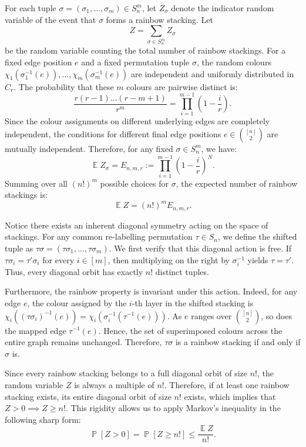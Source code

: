 \documentclass[10pt,a4paper]{amsart}
\newcommand\E{\operatorname{\mathbb{E}}}
\renewcommand\Pr{\operatorname{\mathbb{P}}}
\renewcommand\le{\leqslant}
\renewcommand\ge{\geqslant}
\begin{document}
For each tuple $\sigma = (\sigma_1, \dots, \sigma_m) \in S_n^m$, let $Z_\sigma$ denote the indicator random variable of the event that $\sigma$ forms a rainbow stacking. Let 
$$Z = \sum_{\sigma \in S_n^m} Z_\sigma$$
be the random variable counting the total number of rainbow stackings. For a fixed edge position $e$ and a fixed permutation tuple $\sigma$, the random colours $\chi_1(\sigma_1^{-1}(e)), \dots, \chi_m(\sigma_m^{-1}(e))$ are independent and uniformly distributed in $C_r$. The probability that these $m$ colours are pairwise distinct is:
\[ \frac{r(r-1)\dots(r-m+1)}{r^m} = \prod_{i=1}^{m-1} \left(1 - \frac{i}{r}\right). \]
Since the colour assignments on different underlying edges are completely independent, the conditions for different final edge positions $e \in \binom{[n]}{2}$ are mutually independent. Therefore, for any fixed $\sigma \in S_n^m$, we have:
\begin{equation} \label{eq:EZ_sigma}
\E Z_\sigma = E_{n,m,r} := \prod_{i=1}^{m-1} \left(1 - \frac{i}{r}\right)^N.
\end{equation}
Summing over all $(n!)^m$ possible choices for $\sigma$, the expected number of rainbow stackings is:
\begin{equation} \label{eq:EZ_total}
\E Z = (n!)^m E_{n,m,r}.
\end{equation}

Notice there exists an inherent diagonal symmetry acting on the space of stackings. For any common re-labelling permutation $\tau \in S_n$, we define the shifted tuple as $\tau\sigma = (\tau\sigma_1, \dots, \tau\sigma_m)$. We first verify that this diagonal action is free. If $\tau\sigma_i = \tau'\sigma_i$ for every $i \in [m]$, then multiplying on the right by $\sigma_i^{-1}$ yields $\tau = \tau'$. Thus, every diagonal orbit has exactly $n!$ distinct tuples.

Furthermore, the rainbow property is invariant under this action. Indeed, for any edge $e$, the colour assigned by the $i$-th layer in the shifted stacking is $\chi_i((\tau\sigma_i)^{-1}(e)) = \chi_i(\sigma_i^{-1}(\tau^{-1}(e))).$
As $e$ ranges over $\binom{[n]}{2}$, so does the mapped edge $\tau^{-1}(e)$. Hence, the set of superimposed colours across the entire graph remains unchanged. Therefore, $\tau\sigma$ is a rainbow stacking if and only if $\sigma$ is.

Since every rainbow stacking belongs to a full diagonal orbit of size $n!$, the random variable $Z$ is always a multiple of $n!$. Therefore, if at least one rainbow stacking exists, its entire diagonal orbit of size $n!$ exists, which implies that $Z > 0 \implies Z \ge n!$. This rigidity allows us to apply Markov's inequality in the following sharp form:
\begin{equation} \label{eq:markov_sharp}
\Pr[Z > 0] = \Pr[Z \ge n!] \le \frac{\E Z}{n!}.
\end{equation}
\end{document}
